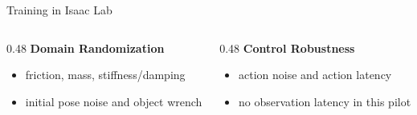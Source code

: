 \documentclass{beamer}
\begin{document}
\begin{frame}{Training in Isaac Lab}
    \vspace{0.4em}
    \begin{columns}[T,onlytextwidth]
        \begin{column}{0.48\textwidth}
            \textbf{\textcolor{maincolor}{Domain Randomization}}
            \begin{itemize}
                \item friction, mass, stiffness/damping
                \item initial pose noise and object wrench
            \end{itemize}
        \end{column}
        \begin{column}{0.48\textwidth}
            \textbf{\textcolor{maincolor}{Control Robustness}}
            \begin{itemize}
                \item action noise and action latency
                \item no observation latency in this pilot
            \end{itemize}
        \end{column}
    \end{columns}
\end{frame}
\end{document}
